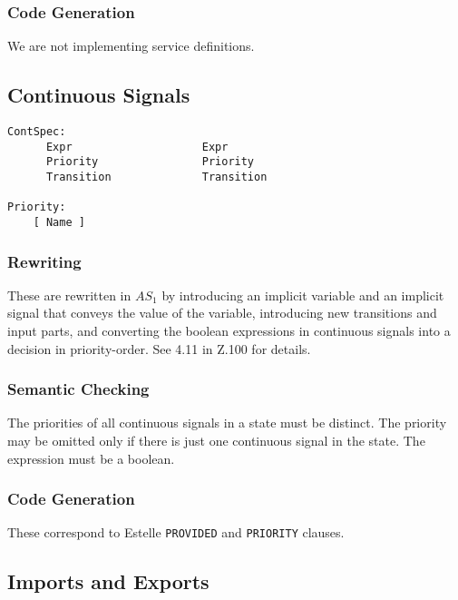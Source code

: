 \subsubsection{Code Generation}

We are not implementing service definitions.

\subsection{Continuous Signals}

\begin{verbatim}
ContSpec:
      Expr                    Expr
      Priority                Priority
      Transition              Transition

Priority:
    [ Name ]
\end{verbatim}

\subsubsection{Rewriting}

These are rewritten in $AS_1$ by introducing an implicit variable and
an implicit signal that conveys the value of the variable,
introducing new transitions and input parts, and converting the
boolean expressions in continuous signals into a decision in
priority-order. See 4.11 in Z.100 for details.

\subsubsection{Semantic Checking}

The priorities of all continuous signals in a state must be distinct.
The priority may be omitted only if there is just one continuous
signal in the state. The expression must be a boolean.

\subsubsection{Code Generation}

These correspond to Estelle {\tt PROVIDED} and {\tt PRIORITY}
clauses.

\subsection{Imports and Exports}

